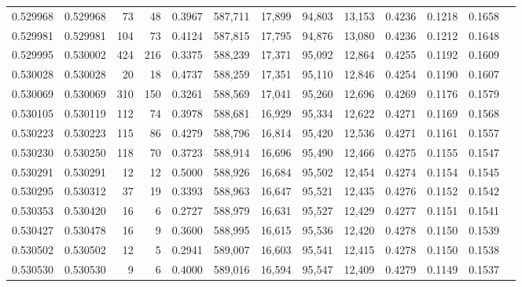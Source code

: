 \begin{tabular}{rrrrrrrrrrrrr}
0.529968 & 0.529968 &    73 &    48 &                                     0.3967 & 587,711 &  17,899 &  94,803 &  13,153 & 0.4236 & 0.1218 & 0.1658 \\
0.529981 & 0.529981 &   104 &    73 &                                     0.4124 & 587,815 &  17,795 &  94,876 &  13,080 & 0.4236 & 0.1212 & 0.1648 \\
0.529995 & 0.530002 &   424 &   216 &                                     0.3375 & 588,239 &  17,371 &  95,092 &  12,864 & 0.4255 & 0.1192 & 0.1609 \\
0.530028 & 0.530028 &    20 &    18 &                                     0.4737 & 588,259 &  17,351 &  95,110 &  12,846 & 0.4254 & 0.1190 & 0.1607 \\
0.530069 & 0.530069 &   310 &   150 &                                     0.3261 & 588,569 &  17,041 &  95,260 &  12,696 & 0.4269 & 0.1176 & 0.1579 \\
0.530105 & 0.530119 &   112 &    74 &                                     0.3978 & 588,681 &  16,929 &  95,334 &  12,622 & 0.4271 & 0.1169 & 0.1568 \\
0.530223 & 0.530223 &   115 &    86 &                                     0.4279 & 588,796 &  16,814 &  95,420 &  12,536 & 0.4271 & 0.1161 & 0.1557 \\
0.530230 & 0.530250 &   118 &    70 &                                     0.3723 & 588,914 &  16,696 &  95,490 &  12,466 & 0.4275 & 0.1155 & 0.1547 \\
0.530291 & 0.530291 &    12 &    12 &                                     0.5000 & 588,926 &  16,684 &  95,502 &  12,454 & 0.4274 & 0.1154 & 0.1545 \\
0.530295 & 0.530312 &    37 &    19 &                                     0.3393 & 588,963 &  16,647 &  95,521 &  12,435 & 0.4276 & 0.1152 & 0.1542 \\
0.530353 & 0.530420 &    16 &     6 &                                     0.2727 & 588,979 &  16,631 &  95,527 &  12,429 & 0.4277 & 0.1151 & 0.1541 \\
0.530427 & 0.530478 &    16 &     9 &                                     0.3600 & 588,995 &  16,615 &  95,536 &  12,420 & 0.4278 & 0.1150 & 0.1539 \\
0.530502 & 0.530502 &    12 &     5 &                                     0.2941 & 589,007 &  16,603 &  95,541 &  12,415 & 0.4278 & 0.1150 & 0.1538 \\
0.530530 & 0.530530 &     9 &     6 &                                     0.4000 & 589,016 &  16,594 &  95,547 &  12,409 & 0.4279 & 0.1149 & 0.1537 \\

\end{tabular}
